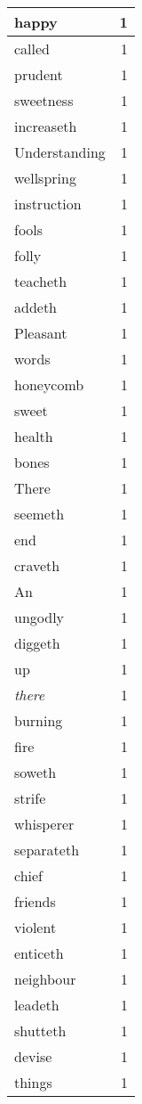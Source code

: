 \begin{center}
\begin{longtable}{l|r}
happy & 1\\ \hline 
called & 1\\ \hline 
prudent & 1\\ \hline 
sweetness & 1\\ \hline 
increaseth & 1\\ \hline 
Understanding & 1\\ \hline 
wellspring & 1\\ \hline 
instruction & 1\\ \hline 
fools & 1\\ \hline 
folly & 1\\ \hline 
teacheth & 1\\ \hline 
addeth & 1\\ \hline 
Pleasant & 1\\ \hline 
words & 1\\ \hline 
honeycomb & 1\\ \hline 
sweet & 1\\ \hline 
health & 1\\ \hline 
bones & 1\\ \hline 
There & 1\\ \hline 
seemeth & 1\\ \hline 
end & 1\\ \hline 
craveth & 1\\ \hline 
An & 1\\ \hline 
ungodly & 1\\ \hline 
diggeth & 1\\ \hline 
up & 1\\ \hline 
\emph{there} & 1\\ \hline 
burning & 1\\ \hline 
fire & 1\\ \hline 
soweth & 1\\ \hline 
strife & 1\\ \hline 
whisperer & 1\\ \hline 
separateth & 1\\ \hline 
chief & 1\\ \hline 
friends & 1\\ \hline 
violent & 1\\ \hline 
enticeth & 1\\ \hline 
neighbour & 1\\ \hline 
leadeth & 1\\ \hline 
shutteth & 1\\ \hline 
devise & 1\\ \hline 
things & 1\\ \hline 

\end{longtable}
\end{center}
